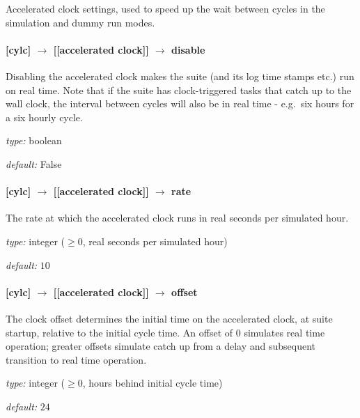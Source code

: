 Accelerated clock settings, used to speed up the wait between cycles in
the simulation and dummy run modes. 

\paragraph[disable]{[cylc] $\rightarrow$ [[accelerated clock]] $\rightarrow$ disable}

Disabling the accelerated clock makes the suite (and its log time stamps
etc.) run on real time. Note that if the suite has clock-triggered tasks
that catch up to the wall clock, the interval between cycles will also be
in real time - e.g.\ six hours for a six hourly cycle.

\begin{myitemize}
    \item {\em type:} boolean 
    \item {\em default:} False
\end{myitemize}


\paragraph[rate]{[cylc] $\rightarrow$ [[accelerated clock]] $\rightarrow$ rate}

The rate at which the accelerated clock runs in real seconds per
simulated hour.

\begin{myitemize}
    \item {\em type:} integer ($\geq 0$, real seconds per simulated hour)
    \item {\em default:} $10$
\end{myitemize}

\paragraph[offset]{[cylc] $\rightarrow$ [[accelerated clock]] $\rightarrow$ offset}

The clock offset determines the initial time on the accelerated clock, 
at suite startup, relative to the initial cycle time. An offset of
$0$ simulates real time operation; greater offsets simulate catch up
from a delay and subsequent transition to real time operation.

\begin{myitemize}
    \item {\em type:} integer ($\geq 0$, hours behind initial cycle time)
    \item {\em default:} $24$
\end{myitemize}


